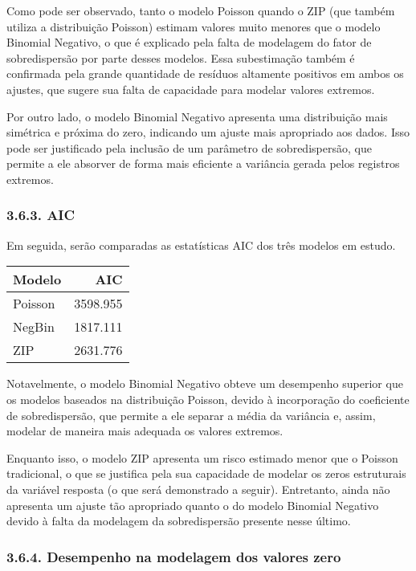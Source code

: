 \documentclass[
]{article}
\begin{document}
Como pode ser observado, tanto o modelo Poisson quando o ZIP (que também
utiliza a distribuição Poisson) estimam valores muito menores que o
modelo Binomial Negativo, o que é explicado pela falta de modelagem do
fator de sobredispersão por parte desses modelos. Essa subestimação
também é confirmada pela grande quantidade de resíduos altamente
positivos em ambos os ajustes, que sugere sua falta de capacidade para
modelar valores extremos.

Por outro lado, o modelo Binomial Negativo apresenta uma distribuição
mais simétrica e próxima do zero, indicando um ajuste mais apropriado
aos dados. Isso pode ser justificado pela inclusão de um parâmetro de
sobredispersão, que permite a ele absorver de forma mais eficiente a
variância gerada pelos registros extremos.

\subsubsection{3.6.3. AIC}\label{aic-1}

Em seguida, serão comparadas as estatísticas AIC dos três modelos em
estudo.

\begin{longtable}[]{@{}lr@{}}
\toprule\noalign{}
Modelo & AIC \\
\midrule\noalign{}
\endhead
\bottomrule\noalign{}
\endlastfoot
Poisson & 3598.955 \\
NegBin & 1817.111 \\
ZIP & 2631.776 \\
\end{longtable}

Notavelmente, o modelo Binomial Negativo obteve um desempenho superior
que os modelos baseados na distribuição Poisson, devido à incorporação
do coeficiente de sobredispersão, que permite a ele separar a média da
variância e, assim, modelar de maneira mais adequada os valores
extremos.

Enquanto isso, o modelo ZIP apresenta um risco estimado menor que o
Poisson tradicional, o que se justifica pela sua capacidade de modelar
os zeros estruturais da variável resposta (o que será demonstrado a
seguir). Entretanto, ainda não apresenta um ajuste tão apropriado quanto
o do modelo Binomial Negativo devido à falta da modelagem da
sobredispersão presente nesse último.

\subsubsection{3.6.4. Desempenho na modelagem dos valores
zero}\label{desempenho-na-modelagem-dos-valores-zero}
\end{document}
